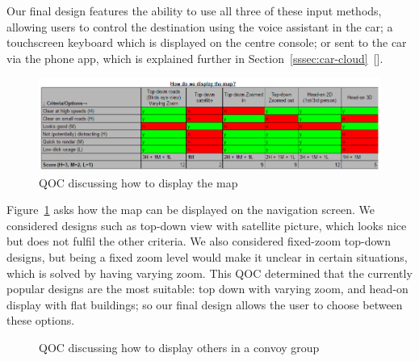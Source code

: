 \documentclass{article}
\begin{document}
Our final design features the ability to use all three of these input methods, allowing users to control the destination using the voice assistant
%
%
in the car; a touchscreen keyboard which is displayed on the centre console; or sent to the car via the phone app, which is explained further in Section~\ref{sssec:car-cloud}~[].

\begin{figure}[H]
  \centering
  \includegraphics[width=\linewidth]{qoc-nav-map}
  \caption{QOC discussing how to display the map}\label{qoc-map}
\end{figure}
Figure~\ref{qoc-map} asks how the map can be displayed on the navigation screen. We considered designs such as top-down view with satellite picture, which looks nice but does not fulfil the other criteria. We also considered fixed-zoom top-down designs, but being a fixed zoom level would make it unclear in certain situations, which is solved by having varying zoom. This QOC determined that the currently popular designs are the most suitable: top down with varying zoom, and head-on display with flat buildings; so our final design allows the user to choose between these options.

\begin{figure}[H]
  \centering
  \caption{QOC discussing how to display others in a convoy group}\label{qoc-convoy}
\end{figure}
\end{document}
